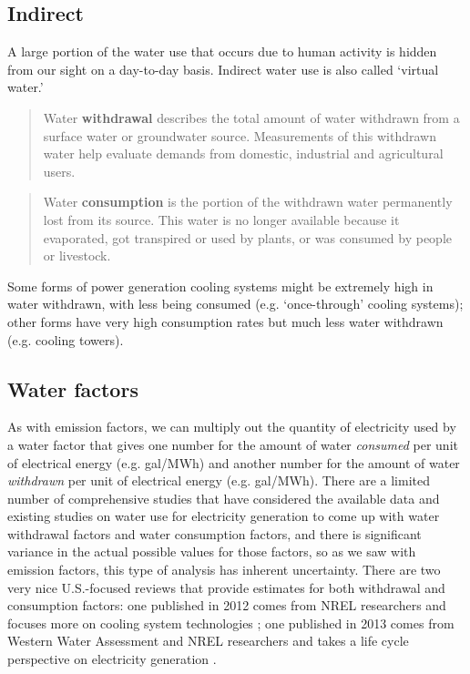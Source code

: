 \documentclass[10pt]{article}
\begin{document}
\subsection{Indirect}

A large portion of the water use that occurs due to human activity is hidden from our sight on a day-to-day basis. Indirect water use is also called `virtual water.'

\begin{quote}
    Water \textbf{withdrawal} describes the total amount of water withdrawn from a surface water or groundwater source. Measurements of this withdrawn water help evaluate demands from domestic, industrial and agricultural users. \cite{noauthor_2017-gg}
\end{quote}

\begin{quote}
Water \textbf{consumption} is the portion of the withdrawn water permanently lost from its source. This water is no longer available because it evaporated, got transpired or used by plants, or was consumed by people or livestock.
 \cite{noauthor_2017-gg}
\end{quote}

Some forms of power generation cooling systems might be extremely high in water withdrawn, with less being consumed (e.g. `once-through' cooling systems); other forms have very high consumption rates but much less water withdrawn (e.g. cooling towers). 


\subsection{Water factors}

As with emission factors, we can multiply out the quantity of electricity used by a water factor that  gives one number for the amount of water \textit{consumed} per unit of electrical energy (e.g. gal/MWh) and another number for the amount of water \textit{withdrawn} per unit of electrical energy (e.g. gal/MWh). There are a limited number of comprehensive studies that have considered the available data and existing studies on water use for electricity generation to come up with water withdrawal factors and water consumption factors, and there is significant variance in the actual possible values for those factors, so as we saw with emission factors, this type of analysis has inherent uncertainty. There are two very nice U.S.-focused reviews that provide estimates for both withdrawal and consumption factors: one published in 2012 comes from NREL researchers and focuses more on cooling system technologies \cite{Macknick2012-ol}; one published in 2013 comes from Western Water Assessment and NREL researchers and takes a life cycle perspective on electricity generation \cite{Meldrum2013-nk}.
\end{document}
